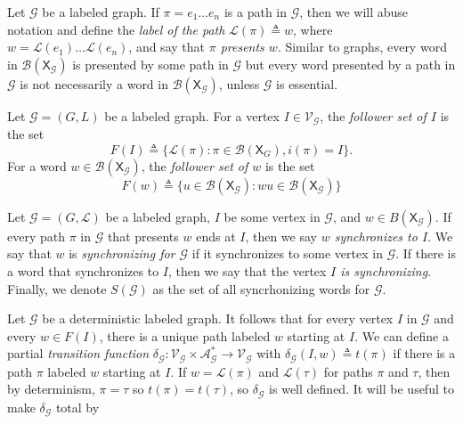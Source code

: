 \documentclass[hidelinks]{article}
\newcommand{\Ac}{\mathcal{A}}  %
\newcommand{\Lc}{\mathcal{L}}  %
\newcommand{\Gc}{\mathcal{G}}  %
\newcommand{\Vc}{\mathcal{V}}
\newcommand{\Bc}{\mathcal{B}}
\newcommand{\shift}[1]{\mathsf{X}_{#1}}
\newcommand{\term}[1]{\textit{#1}}
\theoremstyle{definition}
\begin{document}
Let \(\Gc\) be a labeled graph. 
If \(\pi = e_1 \dots e_n\) is a path in \(\Gc\), then we will abuse notation and 
define the \term{label of the path} \(\Lc(\pi) \triangleq w\),
where \(w = \Lc(e_1) \dots \Lc(e_n)\), and say that \term{\(\pi\)
presents \(w\)}. 
Similar to graphs, every word in \(\Bc(\shift{\Gc})\) is
presented by some path in \(\Gc\) but every word presented by a path in \(\Gc\) is 
not necessarily a word in \(\Bc(\shift{\Gc})\), unless \(\Gc\) is essential.

\begin{definition}
    Let \(\Gc = (G, L)\) be a labeled graph. For a vertex \(I \in \Vc_\Gc\), the 
    \term{follower set of \(I\)} is the set 
    \[F(I) \triangleq \big\{ \Lc(\pi) : \pi \in \Bc(\shift{G}), i(\pi) = I \big\}.\]
    For a word \(w \in \Bc(\shift{\Gc})\), the \term{follower set of \(w\)}
    is the set 
    \[F(w) \triangleq \big\{ u \in \Bc(\shift{\Gc}) : wu \in \Bc(\shift{\Gc})\big\}\]
\end{definition}

\begin{definition}
    Let \(\Gc = (G, \Lc)\) be a labeled graph, \(I\) be some vertex in \(\Gc\), and \(w \in B(\shift{\Gc})\).
    If every path \(\pi\) in \(\Gc\) that presents \(w\) ends at \(I\), then we say \term{\(w\) synchronizes to \(I\)}.
    We say that \(w\) is \term{synchronizing for \(\Gc\)} if it synchronizes to some vertex in \(\Gc\). 
    If there is a word that synchronizes to \(I\), then we say that the vertex \term{\(I\) is synchronizing}.
    Finally, we denote 
    \(S(\Gc)\) as the set of all syncrhonizing words for \(\Gc\).
\end{definition}

Let \(\Gc\) be a deterministic labeled graph. It follows that for every vertex \(I\) in \(\Gc\)
and every \(w \in F(I)\), there is a unique path labeled \(w\) starting at \(I\). We can 
define a partial \term{transition function} \(\delta_\Gc : \Vc_\Gc \times \Ac_\Gc^* \to \Vc_\Gc\) 
with \(\delta_\Gc(I, w) \triangleq t(\pi)\) if there is a path \(\pi\) labeled \(w\) starting 
at \(I\). If \(w = \Lc(\pi)\) and \(\Lc(\tau)\) for paths \(\pi\) and \(\tau\), then by 
determinism, \(\pi = \tau\) so \(t(\pi) = t(\tau)\), so \(\delta_\Gc\) is well defined.
It will be useful to make \(\delta_\Gc\) total by 
\end{document}
